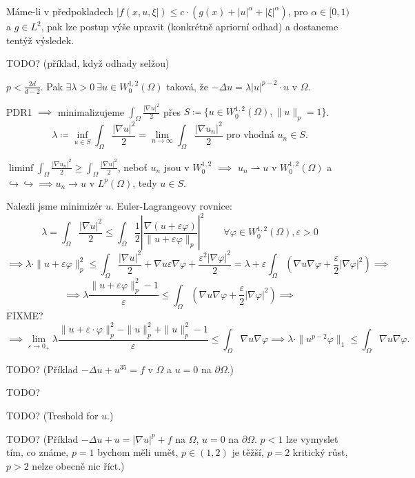 \documentclass[12pt]{article}					%
\begin{document}
\begin{lemma}
	\begin{poznamkain}[$\dagger$]
		Máme-li v předpokladech $|f(x, u, ξ|) ≤ c·(g(x) + |u|^α + |ξ|^α)$, pro $α \in [0, 1)$ a $g \in L^2$, pak lze postup výše upravit (konkrétně apriorní odhad) a dostaneme tentýž výsledek.
	\end{poznamkain}

	TODO? (příklad, když odhady selžou)
\end{lemma}

\begin{lemma}
	$p < \frac{2d}{d - 2}$. Pak $\exists λ > 0\ \exists u \in W_0^{1, 2}(Ω)$ taková, že $-Δu = λ |u|^{p - 2}·u$ v $Ω$.

	\begin{dukazin}
		PDR1 $\implies$ minimalizujeme $\int_Ω \frac{|\nabla u|^2}{2}$ přes $S \coloneq \{u \in W_0^{1, 2}(Ω), \|u\|_p = 1\}$.
		$$ λ \coloneq \inf_{u \in S} \int_Ω \frac{|\nabla u|^2}{2} = \lim_{n \rightarrow ∞} \int_Ω \frac{|\nabla u_n|^2}{2} \text{ pro vhodná $u_n \in S$}. $$

		$\liminf \int_Ω \frac{|\nabla u_n|^2}{2} ≥ \int_Ω \frac{|\nabla u|^2}{2}$, neboť $u_n$ jsou v $W_0^{1, 2}$ $\implies$ $u_n \rightharpoonup u$ v $W_0^{1, 2}(Ω)$ a $\hookrightarrow\hookrightarrow \implies u_n \rightarrow u$ v $L^p(Ω)$, tedy $u \in S$.

		Nalezli jsme minimizér $u$. Euler-Lagrangeovy rovnice:
		$$ λ = \int_Ω \frac{|\nabla u|^2}{2} ≤ \int_Ω \frac{1}{2} \left|\frac{\nabla (u + ε φ)}{\|u + ε φ\|_p}\right|^2 \qquad \forall φ \in W_0^{1, 2}(Ω), ε > 0 $$
		$$ \implies λ·\|u + ε φ\|_p^2 ≤ \int_Ω \frac{|\nabla u|^2}{2} + \nabla u ε \nabla φ + \frac{ε^2 |\nabla φ|^2}{2} = λ + ε \int_Ω(\nabla u \nabla φ + \frac{ε}{2} |\nabla φ|^2) \implies $$
		$$ \implies λ \frac{\|u + ε φ\|_p^2 - 1}{ε} ≤ \int_Ω (\nabla u \nabla φ + \frac{ε}{2} |\nabla φ|^2) \implies $$
		FIXME?
		$$ \implies \lim_{ε \rightarrow 0_+} λ \frac{\|u + ε·φ\|_p^2 - \|u\|_p^2 + \|u\|_p^2 - 1}{ε} ≤ \int_Ω \nabla u \nabla φ \implies λ·\|u^{p - 2} φ\|_1 ≤ \int_Ω \nabla u\nabla φ. $$
	\end{dukazin}
\end{lemma}

TODO? (Příklad $-Δ u + u^{35} = f$ v $Ω$ a $u = 0$ na $\partial Ω$.)

TODO?

TODO? (Treshold for $u$.)

TODO? (Příklad $-Δ u + u = |\nabla u|^p + f$ na $Ω$, $u = 0$ na $\partial Ω$. $p < 1$ lze vymyslet tím, co známe, $p = 1$ bychom měli umět, $p \in (1, 2)$ je těžší, $p = 2$ kritický růst, $p > 2$ nelze obecně nic říct.)
\end{document}
